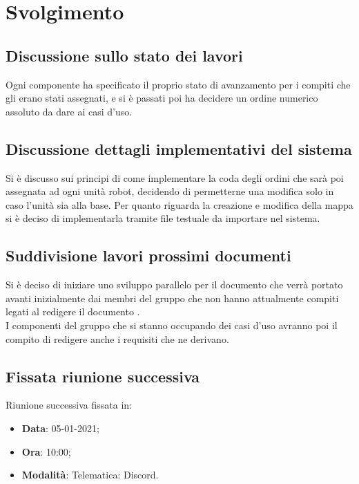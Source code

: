 \documentclass[]{article}
\begin{document}
	\newpage

	\section{Svolgimento}
		\subsection{Discussione sullo stato dei lavori}
        Ogni componente ha specificato il proprio stato di avanzamento per i compiti che gli erano stati assegnati, e si è passati poi ha decidere un ordine numerico assoluto da dare ai casi d'uso.

        \subsection{Discussione dettagli implementativi del sistema}
        Si è discusso sui principi di come implementare la coda degli ordini che sarà poi assegnata ad ogni unità robot, decidendo di permetterne una modifica solo in caso l'unità sia alla base. Per quanto riguarda la creazione e modifica della mappa si è deciso di implementarla tramite file testuale da importare nel sistema.
        
        \subsection{Suddivisione lavori prossimi documenti}
        Si è deciso di iniziare uno sviluppo parallelo per il documento  che verrà portato avanti inizialmente dai membri del gruppo che non hanno attualmente compiti legati al redigere il documento . \\
        I componenti del gruppo che si stanno occupando dei casi d'uso avranno poi il compito di redigere anche i requisiti che ne derivano.

		\subsection{Fissata riunione successiva}
		Riunione successiva fissata in:
		\begin{itemize}
			\item \textbf{Data}: 05-01-2021;
			\item \textbf{Ora}: 10:00;
			\item \textbf{Modalità}: Telematica: Discord.
		\end{itemize}
\end{document}
